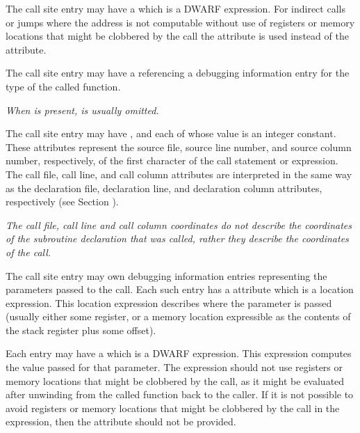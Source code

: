 The call site entry may have a 
\DWATcalltargetclobberedDEFN{}
which is a DWARF expression.  For indirect calls or jumps where the
address is not computable without use of registers or memory locations that
might be clobbered by the call the \DWATcalltargetclobberedNAME{}
attribute is used instead of the \DWATcalltarget{} attribute.

The call site entry may have a \DWATtypeDEFN{}
referencing a debugging information entry for the type of the called function.  

\textit{When \DWATcallorigin{} is present, \DWATtypeNAME{} is usually omitted.}

The call site entry may have 
\DWATcallfileNAME{}, \DWATcalllineNAME{} and \DWATcallcolumnNAME{} 
each of whose value is an integer constant.
These attributes represent the source file, source line number, and source
column number, respectively, of the first character of the call statement or
expression.  The call file, call line, and call column attributes are
interpreted in the same way as the declaration file, declaration
line, and declaration column attributes, respectively 
(see Section ).

\textit{The call file, call line and call column coordinates do not describe the
coordinates of the subroutine declaration that was called, rather they describe
the coordinates of the call.}

The call site entry may own \DWTAGcallsiteparameterTARG{} debugging information
entries representing the parameters passed to the call.
Each such entry has a \DWATlocation{} attribute which is a location expression.
This location expression describes where the parameter is passed
(usually either some register, or a memory location expressible as the
contents of the stack register plus some offset).

Each \DWTAGcallsiteparameter{} entry may have a 
\DWATcallvalueDEFN{}
which is a DWARF expression.  This expression computes the value
passed for that parameter.  The expression should not use registers or memory
locations that might be clobbered by the call, as it might be evaluated after
unwinding from the called function back to the caller.  If it is not
possible to avoid registers or memory locations that might be clobbered by
the call in the expression, then the \DWATcallvalueNAME{} attribute should
not be provided.

